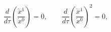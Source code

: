 \begin{equation}
\frac{d}{d\tau}
\left(
\frac{\dot{x}{}^1}{\dot{x}{}^0}\right)=0,
\qquad
\frac{d}{d\tau}
\left(
\frac{\dot{x}{}^1}{\dot{x}{}^0}\right)^2=0,
\label{x1x0}
\end{equation}


